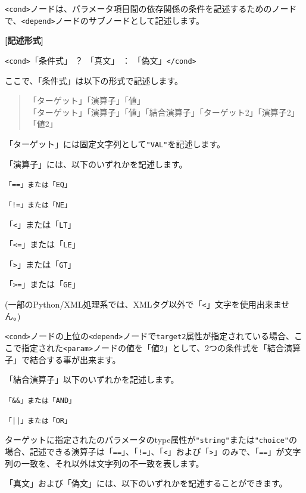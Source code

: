 \documentclass[a4paper,11pt]{jarticle}
\begin{document}
{\texttt{<cond>}ノードは、パラメータ項目間の依存関係の条件を記述するためのノードで、\texttt{<depend>}ノードのサブノードとして記述します。

\vspace{8pt}
\leftskip=12pt
\textbf{[記述形式]}

\leftskip=42pt
\texttt{<cond>}「条件式」 ？ 「真文」 ： 「偽文」\texttt{</cond>}

\vspace{8pt}
\leftskip=0pt
ここで、「条件式」は以下の形式で記述します。
\begin{quote}
「ターゲット」「演算子」「値」\\
「ターゲット」「演算子」「値」「結合演算子」「ターゲット2」「演算子2」「値2」
\end{quote}

「ターゲット」には固定文字列として\texttt{"VAL"}を記述します。

\vspace{12pt}

「演算子」には、以下のいずれかを記述します。

\leftskip=10pt
{\tt 「==」または「EQ」}

{\tt 「!=」または「NE」}

「\texttt{<}」または「{\tt LT}」

「\texttt{<=}」または「{\tt LE}」

「\texttt{>}」または「{\tt GT}」

「\texttt{>=}」または「{\tt GE}」

\leftskip=0pt
(一部のPython/XML処理系では、XMLタグ以外で「\texttt{<}」文字を使用出来ません。)

\medskip
\texttt{<cond>}ノードの上位の\texttt{<depend>}ノードで\texttt{target2}属性が指定されている場合、ここで指定された\texttt{<param>}ノードの値を「値2」として、2つの条件式を「結合演算子」で結合する事が出来ます。

「結合演算子」以下のいずれかを記述します。

\leftskip=10pt
{\tt 「\&\&」または「AND」}

{\tt 「||」または「OR」}


\vspace{12pt}

ターゲットに指定されたのパラメータのtype属性が\texttt{"string"}または\texttt{"choice"}の場合、記述できる演算子は「\texttt{==}」、「\texttt{!=}」、「\texttt{<}」および「\texttt{>}」のみで、「\texttt{==}」が文字列の一致を、それ以外は文字列の不一致を表します。

「真文」および「偽文」には、以下のいずれかを記述することができます。

}
\end{document}

